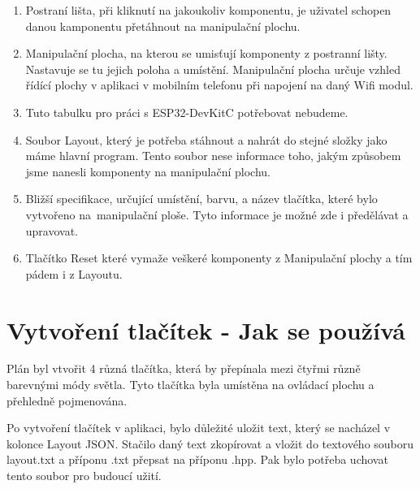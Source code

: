 \begin{enumerate}
	\item Postraní lišta, při kliknutí na jakoukoliv komponentu, je uživatel schopen danou kamponentu přetáhnout na manipulační plochu. 
	\item Manipulační plocha, na kterou se umisťují komponenty z postranní lišty. Nastavuje se tu jejich poloha a umístění. Manipulační plocha určuje vzhled řídící plochy v aplikaci v mobilním telefonu při napojení na daný Wifi modul. 
	\item  Tuto tabulku pro práci s ESP32-DevKitC potřebovat nebudeme.
	\item  Soubor Layout, který je potřeba stáhnout a nahrát do stejné složky jako máme hlavní program. Tento soubor nese informace toho, jakým způsobem jsme nanesli komponenty na manipulační plochu.
	\item Bližší specifikace, určující umístění, barvu, a název tlačítka, které bylo vytvořeno na~manipulační ploše. Tyto informace je možné zde i předělávat a upravovat.
	\item Tlačítko Reset které vymaže veškeré komponenty z Manipulační plochy a tím pádem i z Layoutu.
\end{enumerate}



\section{Vytvoření tlačítek - Jak se používá}
Plán byl vtvořit 4 různá tlačítka, která by přepínala mezi čtyřmi různě barevnými módy světla. Tyto tlačítka byla umístěna na ovládací plochu a přehledně pojmenována. 

Po vytvoření tlačítek v aplikaci, bylo důležité uložit text, který se nacházel v kolonce Layout JSON. Stačilo daný text zkopírovat a vložit do textového souboru layout.txt a příponu .txt přepsat na příponu .hpp. Pak bylo potřeba uchovat tento soubor pro budoucí užití.
\newpage


